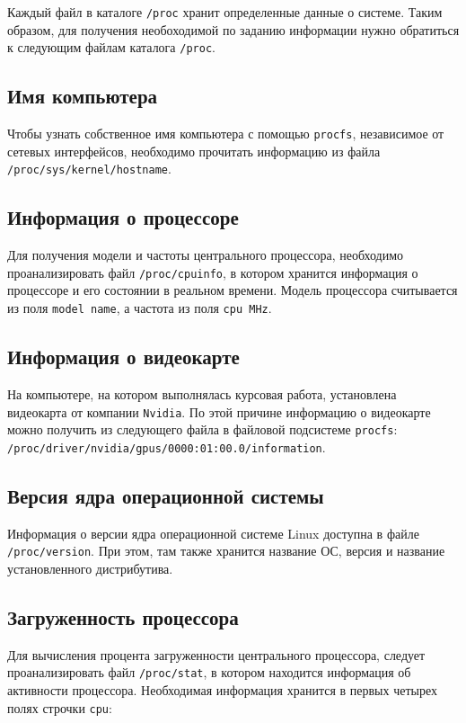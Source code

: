 Каждый файл в каталоге \texttt{/proc} хранит определенные данные о системе. Таким образом, для получения необоходимой по заданию информации нужно обратиться к следующим файлам каталога \texttt{/proc}.


\subsection{Имя компьютера}

Чтобы узнать собственное имя компьютера с помощью \texttt{procfs}, независимое от сетевых интерфейсов, необходимо прочитать информацию из файла \texttt{/proc/sys/kernel/hostname}.


\subsection{Информация о процессоре}

Для получения модели и частоты центрального процессора, необходимо  проанализировать файл \texttt{/proc/cpuinfo}, в котором хранится информация о процессоре и его состоянии в реальном времени. Модель процессора считывается из поля \texttt{model name}, а частота из поля \texttt{cpu MHz}.

\subsection{Информация о видеокарте}

На компьютере, на котором выполнялась курсовая работа, установлена видеокарта от компании \texttt{Nvidia}. По этой причине информацию о видеокарте можно получить из следующего файла в файловой подсистеме \texttt{procfs}: \texttt{/proc/driver/nvidia/gpus/0000:01:00.0/information}.


\subsection{Версия ядра операционной системы}

Информация о версии ядра операционной системе Linux доступна в файле \texttt{/proc/version}. При этом, там также хранится название ОС, версия и название установленного дистрибутива.


\subsection{Загруженность процессора}

Для вычисления процента загруженности центрального процессора, следует проанализировать файл \texttt{/proc/stat}, в котором находится информация об активности процессора. Необходимая информация хранится в первых четырех полях строчки \texttt{cpu}:


